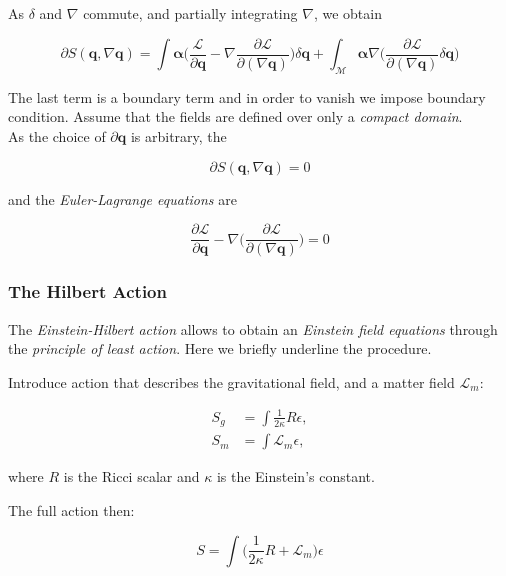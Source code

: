 As $\delta$ and $\nabla$ commute, and partially integrating $\nabla$, we obtain

\begin{equation}
\partial S(\boldsymbol{q}, \nabla\boldsymbol{q}) = \int\boldsymbol{\alpha}\Big(\frac{\mathcal{L}}{\partial\boldsymbol{q}}-\nabla\frac{\partial \mathcal{L}}{\partial(\nabla\boldsymbol{q})}\Big)\delta\boldsymbol{q} + \int_{\mathcal{M}}\boldsymbol{\alpha}\nabla\Big(\frac{\partial\mathcal{L}}{\partial(\nabla\boldsymbol{q})}\delta\boldsymbol{q}\Big)
\end{equation}

The last term is a boundary term and in order to vanish we impose boundary condition. 
Assume that the fields are defined over only a \textit{compact domain}. \\
As the choice of $\partial\boldsymbol{q}$ is arbitrary, the 

\begin{equation}
\partial S(\boldsymbol{q}, \nabla\boldsymbol{q}) = 0
\end{equation}

and the \textit{Euler-Lagrange equations} are

\begin{equation}
\frac{\partial \mathcal{L}}{\partial\boldsymbol{q}} - \nabla\Big(\frac{\partial\mathcal{L}}{\partial(\nabla\boldsymbol{q})}\Big) = 0
\label{eq:theory:eulerlagrange}
\end{equation}

\subsubsection{The Hilbert Action}

The \textit{Einstein-Hilbert action} allows to obtain an \textit{Einstein field equations} through the \textit{principle of least action}. Here we briefly underline the procedure.

Introduce action that describes the gravitational field, and a matter field $\mathcal{L}_m$:

\begin{align}
S_g &= \int\frac{1}{2\kappa}R\epsilon, \\
S_m &= \int\mathcal{L}_{m}\epsilon,
\end{align}

where $R$ is the Ricci scalar and $\kappa$ is the  Einstein's constant.

The full action then:

\begin{equation}
S = \int\Big(\frac{1}{2\kappa}R+\mathcal{L}_m\Big)\epsilon
\end{equation}

